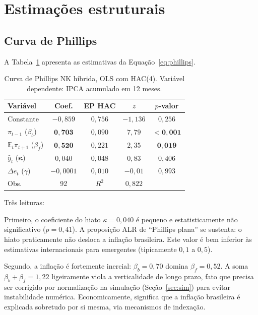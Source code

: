 \documentclass[11pt,a4paper]{article}
\begin{document}
\section{Estimações estruturais}\label{sec:est}

\subsection{Curva de Phillips}

A Tabela~\ref{tab:phillips} apresenta as estimativas da Equação~\ref{eq:phillips}.

\begin{table}[H]
\centering
\small
\begin{tabular}{lcccc}
\toprule
Variável & Coef. & EP HAC & $z$ & $p$-valor \\
\midrule
Constante & $-0{,}859$ & $0{,}756$ & $-1{,}136$ & $0{,}256$ \\
$\pi_{t-1}$ ($\beta_b$) & $\mathbf{0{,}703}$ & $0{,}090$ & $7{,}79$ & $\mathbf{<0{,}001}$ \\
$\mathbb{E}_t \pi_{t+1}$ ($\beta_f$) & $\mathbf{0{,}520}$ & $0{,}221$ & $2{,}35$ & $\mathbf{0{,}019}$ \\
$\hat{y}_t$ ($\boldsymbol{\kappa}$) & $0{,}040$ & $0{,}048$ & $0{,}83$ & $0{,}406$ \\
$\Delta e_t$ ($\gamma$) & $-0{,}0001$ & $0{,}010$ & $-0{,}01$ & $0{,}993$ \\
\midrule
Obs. & 92 & $R^2$ & $0{,}822$ & \\
\bottomrule
\end{tabular}
\caption{Curva de Phillips NK híbrida, OLS com HAC(4). Variável dependente:
IPCA acumulado em 12 meses.}
\label{tab:phillips}
\end{table}

Três leituras:

Primeiro, o coeficiente do hiato $\kappa = 0{,}040$ é pequeno e
estatisticamente não significativo ($p = 0{,}41$). A proposição ALR de
``Phillips plana'' se sustenta: o hiato praticamente não desloca a
inflação brasileira. Este valor é bem inferior às estimativas
internacionais para emergentes (tipicamente $0{,}1$ a $0{,}5$).

Segundo, a inflação é fortemente inercial: $\beta_b = 0{,}70$ domina
$\beta_f = 0{,}52$. A soma $\beta_b + \beta_f = 1{,}22$ ligeiramente
viola a verticalidade de longo prazo, fato que precisa ser corrigido
por normalização na simulação (Seção~\ref{sec:sim}) para evitar instabilidade
numérica. Economicamente, significa que a inflação brasileira é explicada
sobretudo por si mesma, via mecanismos de indexação.
\end{document}
